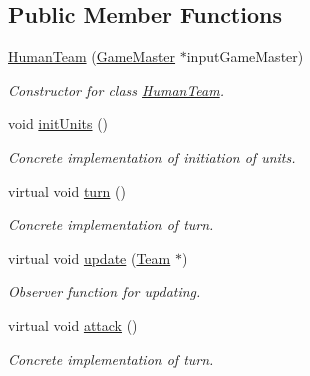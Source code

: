 \subsection*{Public Member Functions}
\begin{DoxyCompactItemize}
\item 
\hypertarget{class_human_team_aa4926770a88ce2e221fc695767b12edc}{}\hyperlink{class_human_team_aa4926770a88ce2e221fc695767b12edc}{Human\+Team} (\hyperlink{class_game_master}{Game\+Master} $\ast$input\+Game\+Master)\label{class_human_team_aa4926770a88ce2e221fc695767b12edc}

\begin{DoxyCompactList}\small\item\em Constructor for class \hyperlink{class_human_team}{Human\+Team}. \end{DoxyCompactList}\item 
\hypertarget{class_human_team_a73c48edfdba41e5928aaecd6775a54ee}{}void \hyperlink{class_human_team_a73c48edfdba41e5928aaecd6775a54ee}{init\+Units} ()\label{class_human_team_a73c48edfdba41e5928aaecd6775a54ee}

\begin{DoxyCompactList}\small\item\em Concrete implementation of initiation of units. \end{DoxyCompactList}\item 
\hypertarget{class_human_team_a6030c5d87d9e9c684073a62db8bb39f0}{}virtual void \hyperlink{class_human_team_a6030c5d87d9e9c684073a62db8bb39f0}{turn} ()\label{class_human_team_a6030c5d87d9e9c684073a62db8bb39f0}

\begin{DoxyCompactList}\small\item\em Concrete implementation of turn. \end{DoxyCompactList}\item 
\hypertarget{class_human_team_a31ac89b8757195f7423a9be5f05d27d5}{}virtual void \hyperlink{class_human_team_a31ac89b8757195f7423a9be5f05d27d5}{update} (\hyperlink{class_team}{Team} $\ast$)\label{class_human_team_a31ac89b8757195f7423a9be5f05d27d5}

\begin{DoxyCompactList}\small\item\em Observer function for updating. \end{DoxyCompactList}\item 
\hypertarget{class_human_team_a70453b3e568147bf29c263add3058fbd}{}virtual void \hyperlink{class_human_team_a70453b3e568147bf29c263add3058fbd}{attack} ()\label{class_human_team_a70453b3e568147bf29c263add3058fbd}

\begin{DoxyCompactList}\small\item\em Concrete implementation of turn. \end{DoxyCompactList}\end{DoxyCompactItemize}

